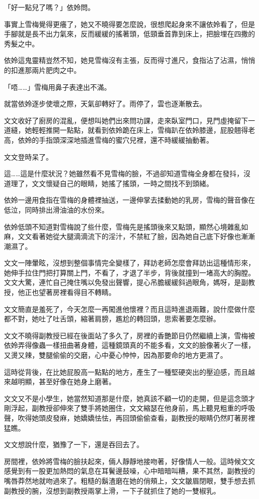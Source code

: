 「好一點兒了嗎？」依姈問。

事實上雪梅覺得更癢了，她又不曉得要怎麼說，很想爬起身來不讓依姈看了，但是手腳就是長不出力氣來，反而緩緩的搖著頭，低頸垂首靠到床上，把臉埋在四撒的秀髮之中。

依姈這鬼靈精豈然不知，她見雪梅沒有主張，反而得寸進尺，食指沾了沾濕，悄悄的扣進那兩片肥肉之中。

「唔……」雪梅用鼻子表達出不滿。

就當依姈逐步使壞之際，天氣卻轉好了。雨停了，雲也逐漸散去。

文文收好了廚房的混亂，便想叫她們出來問功課，走來臥室門口，見門虛掩留下一道縫，她輕輕推開一點點，就看到依姈跪在床上，雪梅趴在依姈膝邊，屁股翹得老高，依姈的手指頭深深地插進雪梅的蜜穴兒裡，還不時緩緩抽動著。

文文登時呆了。

這……這是什麼狀況？她雖然看不見雪梅的臉，不過卻知道雪梅全身都在發抖，沒道理了，文文懷疑自己的眼睛，她搖了搖頭，一時之間找不到頭緒。

依姈一邊用食指在雪梅的身體裡抽送，一邊伸掌去揉動她的乳房，雪梅的聲音像在低泣，同時排出滑油油的水份來。

依姈低頭不知道對雪梅說了些什麼，雪梅先是搖頭後來又點頭，顯然心境雜亂如麻，文文看著她從大腿滴滴流下的淫汁，不禁紅了臉，因為她自己底下好像也漸漸潮濕了。

文文一陣暈眩，沒想到整個事情完全變樣了，拜訪老師怎麼會拜訪出這種情形來，她伸手拉住門把打算關上門，不看了，才退了半步，背後就撞到一堵高大的胸膛。文文大驚，連忙自己掩住嘴以免發出聲響，提心吊膽緩緩斜過眼角，媽呀，是副教授，他正也望著房裡看得目不轉睛。

文文簡直是羞死了，今天怎麼一再闖進他懷裡？而且這時進退兩難，說什麼做什麼都不對，她吐了吐舌頭，縮著肩膀，尷尬的轉回頭，思索著要怎麼辦。

文文不曉得副教授已經在後面站了多久了，房裡的香艷節目仍然繼續上演，雪梅被依姈弄得像蟲一樣扭曲著身體，這種鏡頭真的不能多看，文文的臉像著火了一樣，又燙又辣，雙腿偷偷的交磨，心中憂心忡忡，因為那要命的地方更濕了。

這時從背後，在比她屁股高一點點的地方，產生了一種堅硬突出的壓迫感，而且越來越明顯，甚至好像在她身上磨著。

文文又不是小學生，她當然知道那是什麼，她真該不顧一切的走開，但是這念頭才剛浮起，副教授卻伸來了雙手將她圈住，文文縮瑟在他身前，馬上聽見粗重的呼吸聲，吹得她頭皮發麻，她嬌嬌怯怯，再回頭偷偷查看，副教授的眼睛仍然盯著房裡猛瞧。

文文想說什麼，猶豫了一下，還是吞回去了。

房間裡，依姈將雪梅的臉扶起來，倆人靜靜地接吻著，好像情人一般。這時候文文感覺到有一股更加熱悶的氣息在耳鬢邊鼓噪，心中暗暗叫糟，果不其然，副教授的嘴唇莽然地就吻過來了。粗糙的鬍渣磨在她的俏頰上，文文皺眉閉眼，雙手想去抓副教授的腕，沒想到副教授兩掌上滑，一下子就抓住了她的一雙椒乳。

